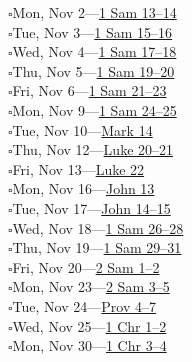 \hypertarget{rp-2026-11-02}{}\noindent$\square$\enspace Mon, Nov 2\enspace---\enspace \hyperlink{ch-1samuel-13}{1 Sam 13--14}\\
\hypertarget{rp-2026-11-03}{}\noindent$\square$\enspace Tue, Nov 3\enspace---\enspace \hyperlink{ch-1samuel-15}{1 Sam 15--16}\\
\hypertarget{rp-2026-11-04}{}\noindent$\square$\enspace Wed, Nov 4\enspace---\enspace \hyperlink{ch-1samuel-17}{1 Sam 17--18}\\
\hypertarget{rp-2026-11-05}{}\noindent$\square$\enspace Thu, Nov 5\enspace---\enspace \hyperlink{ch-1samuel-19}{1 Sam 19--20}\\
\hypertarget{rp-2026-11-06}{}\noindent$\square$\enspace Fri, Nov 6\enspace---\enspace \hyperlink{ch-1samuel-21}{1 Sam 21--23}\\
\hypertarget{rp-2026-11-09}{}\noindent$\square$\enspace Mon, Nov 9\enspace---\enspace \hyperlink{ch-1samuel-24}{1 Sam 24--25}\\
\hypertarget{rp-2026-11-10}{}\noindent$\square$\enspace Tue, Nov 10\enspace---\enspace \hyperlink{ch-mark-14}{Mark 14}\\
\hypertarget{rp-2026-11-12}{}\noindent$\square$\enspace Thu, Nov 12\enspace---\enspace \hyperlink{ch-luke-20}{Luke 20--21}\\
\hypertarget{rp-2026-11-13}{}\noindent$\square$\enspace Fri, Nov 13\enspace---\enspace \hyperlink{ch-luke-22}{Luke 22}\\
\hypertarget{rp-2026-11-16}{}\noindent$\square$\enspace Mon, Nov 16\enspace---\enspace \hyperlink{ch-john-13}{John 13}\\
\hypertarget{rp-2026-11-17}{}\noindent$\square$\enspace Tue, Nov 17\enspace---\enspace \hyperlink{ch-john-14}{John 14--15}\\
\hypertarget{rp-2026-11-18}{}\noindent$\square$\enspace Wed, Nov 18\enspace---\enspace \hyperlink{ch-1samuel-26}{1 Sam 26--28}\\
\hypertarget{rp-2026-11-19}{}\noindent$\square$\enspace Thu, Nov 19\enspace---\enspace \hyperlink{ch-1samuel-29}{1 Sam 29--31}\\
\hypertarget{rp-2026-11-20}{}\noindent$\square$\enspace Fri, Nov 20\enspace---\enspace \hyperlink{ch-2samuel-1}{2 Sam 1--2}\\
\hypertarget{rp-2026-11-23}{}\noindent$\square$\enspace Mon, Nov 23\enspace---\enspace \hyperlink{ch-2samuel-3}{2 Sam 3--5}\\
\hypertarget{rp-2026-11-24}{}\noindent$\square$\enspace Tue, Nov 24\enspace---\enspace \hyperlink{ch-proverbs-4}{Prov 4--7}\\
\hypertarget{rp-2026-11-25}{}\noindent$\square$\enspace Wed, Nov 25\enspace---\enspace \hyperlink{ch-1chronicles-1}{1 Chr 1--2}\\
\hypertarget{rp-2026-11-30}{}\noindent$\square$\enspace Mon, Nov 30\enspace---\enspace \hyperlink{ch-1chronicles-3}{1 Chr 3--4}\\
\clearpage
\twocolumn[%
  \vspace*{20pt}%
  {\centering\huge\booktitlefont\scshape December 2026\\%
  \char"2766\par}%
  \vspace{10pt}%
]

